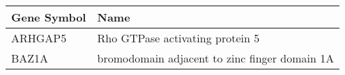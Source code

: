 \begin{tabular}{ll}
\toprule
Gene Symbol &                                          Name \\
\midrule
    ARHGAP5 &               Rho GTPase activating protein 5 \\
      BAZ1A & bromodomain adjacent to zinc finger domain 1A \\
\bottomrule
\end{tabular}
